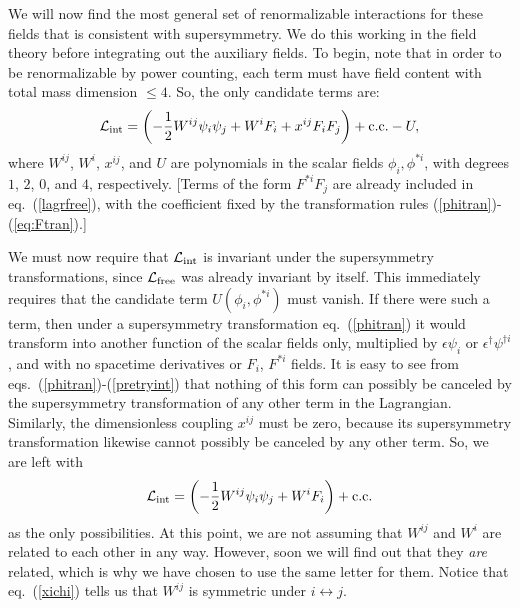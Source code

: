 \documentclass[11pt]{article}
\def\beq{\begin{eqnarray}}
\def\eeq{\end{eqnarray}}
\def\lagr{{\cal L}}
\def\conj{{{\rm c.c.}}}
\def\half{{1\over 2}}
\begin{document}
We will now find the most general set of renormalizable interactions for
these fields that is consistent with supersymmetry. We do this working in
the field theory before integrating out the auxiliary fields. To begin,
note that in order to be renormalizable by power counting, each term must
have field content with total mass dimension $\leq 4$. So, the only
candidate terms are: 
\beq
\lagr_{\rm int} =
\left (-{1\over 2} W^{ij} \psi_i \psi_j + W^i F_i + x^{ij} F_i F_j \right ) 
+ \conj  - U,
\label{pretryint}
\eeq
where $W^{ij}$, $W^i$, $x^{ij}$, and $U$ are polynomials in the scalar
fields $\phi_i, \phi^{*i}$, with degrees $1$, $2$, $0$, and $4$,
respectively. [Terms of the form $F^{*i} F_j$ are already included in 
eq.~(\ref{lagrfree}), with the coefficient fixed by the transformation 
rules (\ref{phitran})-(\ref{eq:Ftran}).]

We must now require that $\lagr_{\rm int}$ is invariant under the
supersymmetry transformations, since $\lagr_{\rm free}$ was already
invariant by itself.  This immediately requires that the candidate term
$U(\phi_i, \phi^{*i})$ must vanish. If there were such a term, then under
a supersymmetry transformation eq.~(\ref{phitran}) it would transform into
another function of the scalar fields only, multiplied by $\epsilon\psi_i$
or ${\epsilon^\dagger}{\psi}^{\dagger i}$, and with no spacetime
derivatives or $F_i$, $F^{*i}$ fields. It is easy to see from
eqs.~(\ref{phitran})-(\ref{pretryint}) that nothing of this form can possibly
be canceled by the supersymmetry transformation of any other term in the
Lagrangian. Similarly, the dimensionless coupling $x^{ij}$ must be zero,
because its supersymmetry transformation likewise cannot possibly be
canceled by any other term. So, we are left with
\beq
\lagr_{\rm int} =
\left (-\half W^{ij} \psi_i \psi_j + W^i F_i \right ) + \conj
\label{tryint}
\eeq
as the only possibilities. At this point, we are not assuming that $W^{ij}$
and $W^i$ are related to each other in any way. However, soon we will 
find out that they {\it are} related, which is why we have chosen to use
the same letter for them. Notice that eq.~(\ref{xichi}) tells us that
$W^{ij}$ is symmetric under $i\leftrightarrow j$. 
\end{document}
